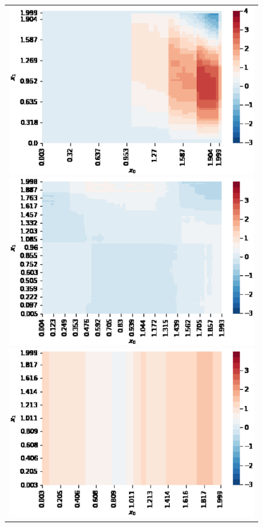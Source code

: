 \begin{figure}[h]
\begin{tabular}{c}
\begin{minipage}{0.24\hsize}
            \includegraphics[width=0.95\hsize]{Matsushima/heatmaps/tvgam-01.eps}
        \end{minipage}
        \begin{minipage}{0.24\hsize}
            \centering
            \includegraphics[width=0.95\hsize]{Matsushima/heatmaps/mltk-01.eps}
        \end{minipage}
        \begin{minipage}{0.24\hsize}
            \centering
            \includegraphics[width=0.95\hsize]{Matsushima/heatmaps/pygam-01.eps}

\end{minipage}
\end{tabular}
\end{figure}
